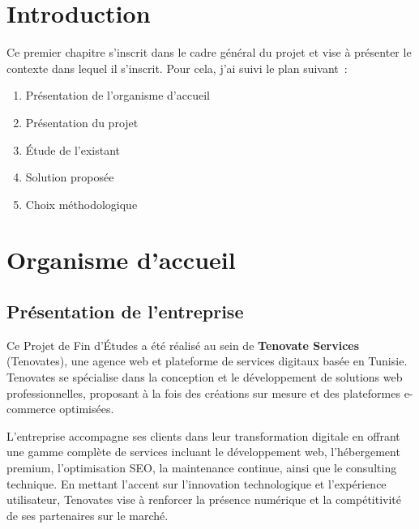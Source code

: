 
\section{Introduction}

Ce premier chapitre s'inscrit dans le cadre général du projet et vise à présenter le contexte
dans lequel il s'inscrit. Pour cela, j'ai suivi le plan suivant~:
\begin{enumerate}
    \item Présentation de l'organisme d'accueil
    \item Présentation du projet
    \item Étude de l'existant
    \item Solution proposée
    \item Choix méthodologique
\end{enumerate}


\section{Organisme d'accueil}

\subsection{Présentation de l'entreprise}

Ce Projet de Fin d'Études a été réalisé au sein de \textbf{Tenovate Services} (Tenovates), une agence web et plateforme de services digitaux basée en Tunisie. Tenovates se spécialise dans la conception et le développement de solutions web professionnelles, proposant à la fois des créations sur mesure et des plateformes e-commerce optimisées. 

L'entreprise accompagne ses clients dans leur transformation digitale en offrant une gamme complète de services incluant le développement web, l'hébergement premium, l'optimisation SEO, la maintenance continue, ainsi que le consulting technique. En mettant l'accent sur l'innovation technologique et l'expérience utilisateur, Tenovates vise à renforcer la présence numérique et la compétitivité de ses partenaires sur le marché.

